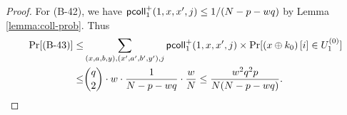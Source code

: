 \begin{proof}
For (B-42), we have $\mathsf{pcoll}_{1}^+(1,x,x',j)\leq1/(N-p-wq)$ by Lemma \ref{lemma:coll-prob}. Thus
%
\begin{align*}
\Pr[\text{(B-43)}] \leq  & \sum_{(x,a,b,y),(x',a',b',y'),j}\mathsf{pcoll}_{1}^+(1,x,x',j)\times\Pr[\left(x \oplus k_{0}\right)[i]\in U_1^{(0)}]          \\
\leq  &  {q\choose2}\cdot w\cdot\frac{1}{N-p-wq}\cdot\frac{w}{N} \leq \frac{w^2q^2p}{N(N-p-wq)} .
\end{align*}


%
%

\end{proof}
